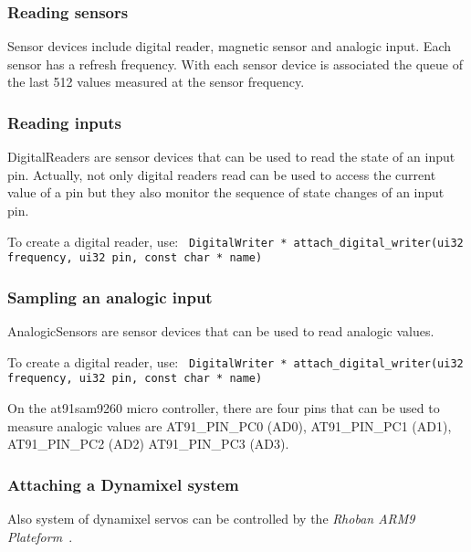 \documentclass[a4paper]{article}
\newcommand{\rhobanp}{\emph{Rhoban ARM9 Plateform}\ }
\newcommand{\instruction}[1]{{\tt #1}}
\begin{document}
\subsubsection{Reading sensors}

Sensor devices include digital reader, magnetic sensor and analogic input.
Each sensor has a refresh frequency.
With each sensor device is associated the
queue of the last 512 values measured at the sensor frequency.

\subsubsection{Reading inputs}

DigitalReaders are sensor devices that can be used to read the state of an input
pin. Actually, not only digital readers read can be used to access the current
value of a pin
but they also monitor the sequence of state changes of an input pin.

To create a digital reader, use:
\instruction{
DigitalWriter * attach\_digital\_writer(ui32 frequency, ui32 pin,
const char * name)}

\subsubsection{Sampling an analogic input}

AnalogicSensors are sensor devices that can be used to read analogic values.

To create a digital reader, use:
\instruction{
DigitalWriter * attach\_digital\_writer(ui32 frequency, ui32 pin,
const char * name)}

On the at91sam9260 micro controller, there are four pins that can be used
to measure analogic values are AT91\_PIN\_PC0 (AD0), AT91\_PIN\_PC1 (AD1),  AT91\_PIN\_PC2 (AD2)
AT91\_PIN\_PC3 (AD3).


\subsubsection{Attaching a Dynamixel system}

Also system of dynamixel servos can be controlled by the \rhobanp.
\end{document}
